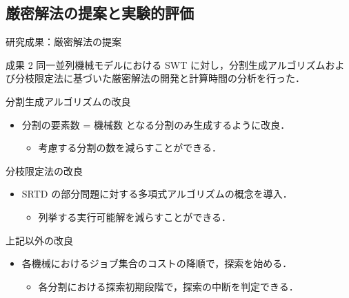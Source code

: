 \documentclass[dvipdfmx]{beamer}
\begin{document}
    \subsection{厳密解法の提案と実験的評価}
    \begin{frame}{研究成果：厳密解法の提案}
      \begin{alertblock}{成果 2}
        同一並列機械モデルにおける SWT に対し，分割生成アルゴリズムおよび分枝限定法に基づいた厳密解法の開発と計算時間の分析を行った．
      \end{alertblock}
      \begin{block}{分割生成アルゴリズムの改良}
        \begin{itemize}
          \item \alert{分割の要素数 = 機械数} となる分割のみ生成するように改良．
          \begin{itemize}
            \item 考慮する分割の数を減らすことができる．
          \end{itemize}
        \end{itemize}
      \end{block}
      \begin{block}{分枝限定法の改良}
        \begin{itemize}
          \item SRTD の\alert{部分問題に対する多項式アルゴリズム}の概念を導入．
          \begin{itemize}
            \item 列挙する実行可能解を減らすことができる．
          \end{itemize}
        \end{itemize}
      \end{block}
      \begin{block}{上記以外の改良}
        \begin{itemize}
          \item 各機械におけるジョブ集合のコストの降順で，探索を始める．
          \begin{itemize}
            \item 各分割における探索初期段階で，探索の中断を判定できる．
          \end{itemize}
        \end{itemize}
      \end{block}
    \end{frame}
\end{document}
